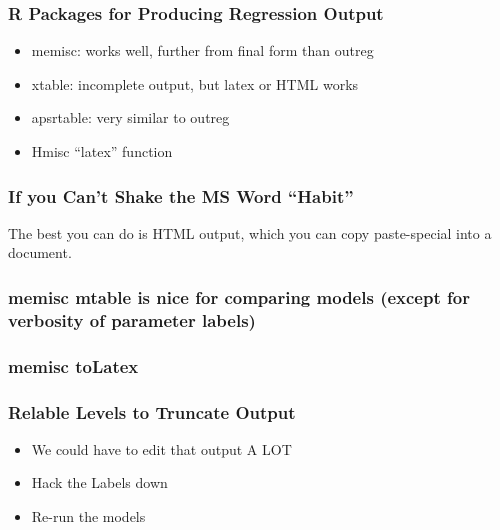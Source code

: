 \documentclass[10pt,english]{beamer}
\begin{document}
\begin{frame}


\footnotesize{

}
\end{frame}



\begin{frame}
  \frametitle {R Packages for Producing Regression Output}

  \begin{itemize}
  \item memisc: works well, further from final form than outreg

  \item xtable: incomplete output, but latex or HTML works

  \item apsrtable: very similar to outreg

  \item Hmisc ``latex'' function

  \end{itemize}
\end{frame}


\begin{frame}




\end{frame}

\begin{frame}[containsverbatim]
  \frametitle{If you Can't Shake the MS Word ``Habit''}

  The best you can do is HTML output, which you can copy paste-special
  into a document.


\end{frame}

\begin{frame}
  \frametitle{memisc mtable is nice for comparing models (except for
    verbosity of parameter labels)}


\end{frame}


\begin{frame}
  \frametitle{memisc toLatex}

\footnotesize{

}
\end{frame}

\begin{frame}
  \frametitle{Relable Levels to Truncate Output}

  \begin{itemize}
    \item We could have to edit that output A LOT


    \item Hack the Labels down


    \item Re-run the models


\end{itemize}
\end{frame}
\end{document}
